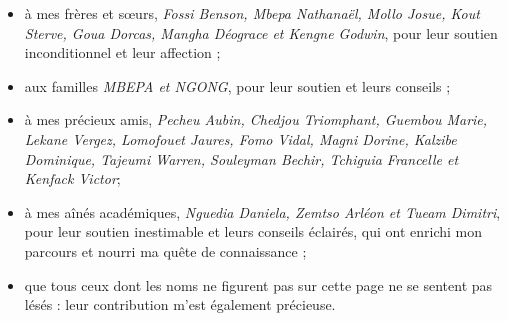 \begin{itemize}
    \item à mes frères et sœurs, \textit{Fossi Benson, Mbepa Nathanaël, Mollo Josue, Kout Sterve, Goua Dorcas, Mangha Déograce et Kengne Godwin}, pour leur soutien inconditionnel et leur affection ;
    \item aux familles \textit{MBEPA et NGONG}, pour leur soutien et leurs conseils ;
    \item à mes précieux amis, \textit{Pecheu Aubin, Chedjou Triomphant,  Guembou Marie, Lekane Vergez, Lomofouet Jaures, Fomo Vidal, Magni Dorine, Kalzibe Dominique, Tajeumi Warren, Souleyman Bechir, Tchiguia Francelle et Kenfack Victor};
    \item à mes aînés académiques, \textit{Nguedia Daniela, Zemtso Arléon et Tueam Dimitri}, pour leur soutien inestimable et leurs conseils éclairés, qui ont enrichi mon parcours et nourri ma quête de connaissance ;
    \item que tous ceux dont les noms ne figurent pas sur cette page ne se sentent pas lésés : leur contribution m'est également précieuse.
\end{itemize}

\myCleanStarChapterEnd
